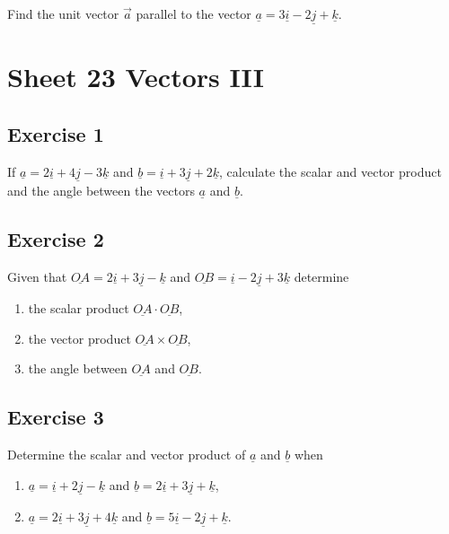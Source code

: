 \documentclass[
  11pt,
  oneside]{book}
\providecommand{\tightlist}{%
  \setlength{\itemsep}{0pt}\setlength{\parskip}{0pt}}
\newcommand{\slide}{}
\theoremstyle{definition}
\theoremstyle{definition}
\theoremstyle{definition}
\theoremstyle{definition}
\theoremstyle{remark}
\begin{document}
Find the unit vector \(\vec{a}\) parallel to the vector \(\underline a=3\underline{i}-2\underline{j}+\underline{k}\).

\slide

\section{Sheet 23 Vectors III}\label{sheet-23-vectors-iii}

\subsection*{Exercise 1}\label{exercise-1-14}

If \(\underline{a} = 2\underline{i} + 4\underline{j} - 3\underline{k}\) and \(\underline{b} = \underline{i} + 3\underline{j} + 2\underline{k}\), calculate the scalar and vector product and the angle between the vectors \(\underline{a}\) and \(\underline{b}\).

\slide

\subsection*{Exercise 2}\label{exercise-2-14}

Given that \(\underline{OA} = 2\underline{i} + 3\underline{j} - \underline{k}\) and \(\underline{OB} = \underline{i} - 2\underline{j} + 3\underline{k}\) determine

\begin{enumerate}
\def\labelenumi{\arabic{enumi}.}
\tightlist
\item
  the scalar product \(\underline{OA}\cdot\underline{OB}\),
\item
  the vector product \(\underline{OA}\times\underline{OB}\),
\item
  the angle between \(\underline{OA}\) and \(\underline{OB}\).
\end{enumerate}

\slide

\subsection*{Exercise 3}\label{exercise-3-12}

Determine the scalar and vector product of \(\underline{a}\) and \(\underline{b}\) when

\begin{enumerate}
\def\labelenumi{\arabic{enumi}.}
\tightlist
\item
  \(\underline{a} = \underline{i} + 2\underline{j} - \underline{k}\) and \(\underline{b} = 2\underline{i} + 3\underline{j} + \underline{k}\),
\item
  \(\underline{a} = 2\underline{i} + 3\underline{j} + 4\underline{k}\) and \(\underline{b} = 5\underline{i} - 2\underline{j} + \underline{k}\).
\end{enumerate}
\end{document}
